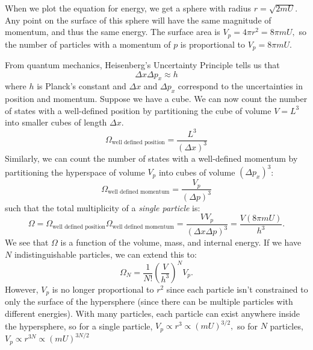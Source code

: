 \begin{itemize}
\begin{idea}
        When we plot the equation for energy, we get a sphere with radius $r=\sqrt{2mU}.$ Any point on the surface of this sphere will have the same magnitude of momentum, and thus the same energy. The surface area is $V_p = 4\pi r^2 = 8\pi mU,$ so the number of particles with a momentum of $p$ is proportional to $\boxed{V_p = 8\pi mU}.$
        \vspace{2mm}
        
        From quantum mechanics, Heisenberg's Uncertainty Principle tells us that 
        \begin{equation}
            \Delta x\Delta p_x \approx h
        \end{equation}
        where $h$ is Planck's constant and $\Delta x$ and $\Delta p_x$ correspond to the uncertainties in position and momentum. Suppose we have a cube. We can now count the number of states with a well-defined position by partitioning the cube of volume $V=L^3$ into smaller cubes of length $\Delta x$.
        \begin{equation}
            \Omega_\text{well defined position} = \frac{L^3}{(\Delta x)^3}
        \end{equation}
        Similarly, we can count the number of states with a well-defined momentum by partitioning the hyperspace of volume $V_p$ into cubes of volume $(\Delta p_x)^3$: 
        \begin{equation}
            \Omega_\text{well defined momentum} = \frac{V_p}{(\Delta p)^3}
        \end{equation}
        such that the total multiplicity of a \textit{single particle} is: 
        \begin{equation}
            \Omega = \Omega_\text{well defined position}\Omega_\text{well defined momentum} = \frac{VV_p}{(\Delta x\Delta p)^3} = \frac{V(8\pi m U)}{h^3}.
        \end{equation}
        We see that $\Omega$ is a function of the volume, mass, and internal energy. If we have $N$ indistinguishable particles, we can extend this to:
        \begin{equation}
            \Omega_N = \frac{1}{N!}\left(\frac{V}{h^3}\right)^NV_p.
        \end{equation}
        However, $V_p$ is no longer proportional to $r^2$ since each particle isn't constrained to only the surface of the hypersphere (since there can be multiple particles with different energies). With many particles, each particle can exist anywhere inside the hypersphere, so for a single particle, $V_p \propto r^3 \propto (mU)^{3/2},$ so for $N$ particles, $V_p \propto r^{3N} \propto (mU)^{3N/2}$
        \vspace{2mm}


\end{idea}
\end{itemize}
